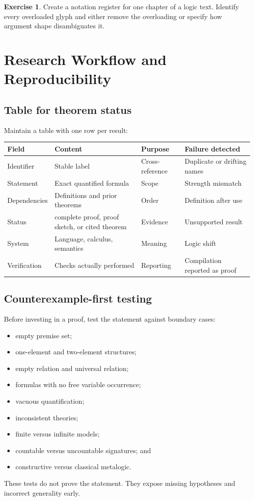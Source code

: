 \documentclass[11pt,oneside,openany]{book}
\theoremstyle{definition}
\newtheorem{exercise}[definition]{Exercise}
\theoremstyle{plain}
\theoremstyle{remark}
\begin{document}
\begin{exercise}
\label{ex:latex-style-02}
Create a notation register for one chapter of a logic text.  Identify every
overloaded glyph and either remove the overloading or specify how argument
shape disambiguates it.
\end{exercise}

\chapter{Research Workflow and Reproducibility}
\label{ch:research-workflow}

\section{Table for theorem status}
\label{sec:research-workflow-01}

Maintain a table with one row per result:
\begin{longtable}{@{}p{}p{}p{}p{}@{}}
\toprule
Field & Content & Purpose & Failure detected \\
\midrule
\endhead
Identifier & Stable label & Cross-reference & Duplicate or drifting names \\
Statement & Exact quantified formula & Scope & Strength mismatch \\
Dependencies & Definitions and prior theorems & Order & Definition after use \\
Status & complete proof, proof sketch, or cited theorem & Evidence & Unsupported result \\
System & Language, calculus, semantics & Meaning & Logic shift \\
Verification & Checks actually performed & Reporting & Compilation reported as proof \\
\bottomrule
\end{longtable}

\section{Counterexample-first testing}
\label{sec:research-workflow-02}

Before investing in a proof, test the statement against boundary cases:
\begin{itemize}
  \item empty premise set;
  \item one-element and two-element structures;
  \item empty relation and universal relation;
  \item formulas with no free variable occurrence;
  \item vacuous quantification;
  \item inconsistent theories;
  \item finite versus infinite models;
  \item countable versus uncountable signatures; and
  \item constructive versus classical metalogic.
\end{itemize}
These tests do not prove the statement.  They expose missing hypotheses and
incorrect generality early.
\end{document}
